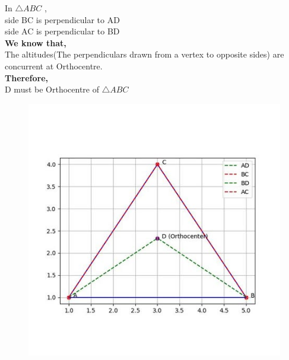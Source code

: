\documentclass[journal]{IEEEtran}
\begin{document}
In $\triangle ABC$ ,\\
  side BC is perpendicular to AD\\
side AC is perpendicular to BD\\
\textbf{We know that,}\\
The altitudes(The perpendiculars drawn from a vertex to opposite sides) are concurrent at Orthocentre.\\
\textbf{Therefore,}\\
D must be Orthocentre of $\triangle ABC$\\
\begin{figure}[h]
    \centering
    \includegraphics[scale=0.5]{figs/2.10.5.jpg}
    \caption{}
    \label{fig:1}
\end{figure}
\end{document}
